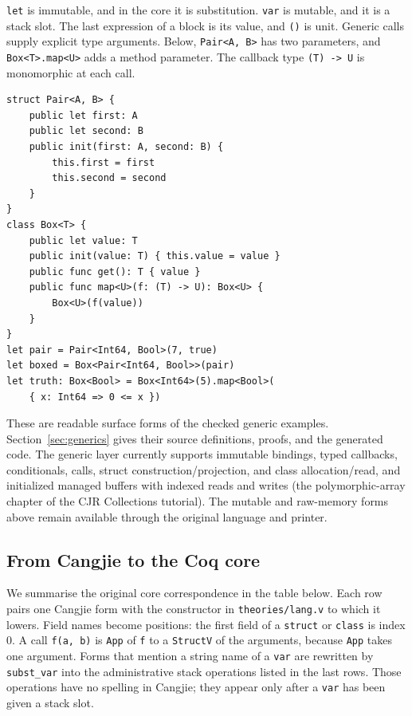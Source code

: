 \documentclass[11pt]{article}
\begin{document}
\texttt{let} is immutable, and in the core it is substitution.
\texttt{var} is mutable, and it is a stack slot.
The last expression of a block is its value, and \texttt{()} is unit.
Generic calls supply explicit type arguments. Below, \texttt{Pair<A, B>}
has two parameters, and \texttt{Box<T>.map<U>} adds a method parameter.
The callback type \texttt{(T) -> U} is monomorphic at each call.

\noindent\begin{minipage}{\linewidth}
\begin{lstlisting}
struct Pair<A, B> {
    public let first: A
    public let second: B
    public init(first: A, second: B) {
        this.first = first
        this.second = second
    }
}
class Box<T> {
    public let value: T
    public init(value: T) { this.value = value }
    public func get(): T { value }
    public func map<U>(f: (T) -> U): Box<U> {
        Box<U>(f(value))
    }
}
let pair = Pair<Int64, Bool>(7, true)
let boxed = Box<Pair<Int64, Bool>>(pair)
let truth: Box<Bool> = Box<Int64>(5).map<Bool>(
    { x: Int64 => 0 <= x })
\end{lstlisting}
\end{minipage}

These are readable surface forms of the checked generic examples.
Section~\ref{sec:generics} gives their source definitions, proofs, and the
generated code. The generic layer currently supports immutable bindings,
typed callbacks, conditionals, calls, struct construction/projection, and
class allocation/read, and initialized managed buffers with indexed reads
and writes (the polymorphic-array chapter of the CJR Collections tutorial). The mutable and raw-memory forms above remain
available through the original language and printer.

\subsection{From Cangjie to the Coq core}

We summarise the original core correspondence in the table below.
Each row pairs one Cangjie form with the constructor in \texttt{theories/lang.v} to which it lowers.
Field names become positions: the first field of a \texttt{struct} or \texttt{class} is index \(0\).
A call \texttt{f(a, b)} is \texttt{App} of \texttt{f} to a \texttt{StructV} of the arguments, because \texttt{App} takes one argument.
Forms that mention a string name of a \texttt{var} are rewritten by \texttt{subst\_var} into the administrative stack operations listed in the last rows.
Those operations have no spelling in Cangjie; they appear only after a \texttt{var} has been given a stack slot.
\end{document}
